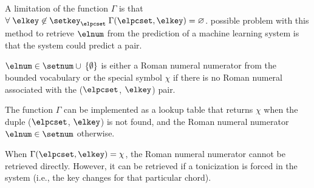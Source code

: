 A limitation of the function $\Gamma$ is that $\forall \;
\elkey \not\in \setkey_\elpcset \; \Gamma(\elpcset, \elkey)
= \varnothing$. possible problem with this method to
retrieve $\elnum$ from the prediction of a machine learning
system is that the system could predict a pair.

$\elnum \in \setnum \cup \: \{ \emptyset \}$ is either a
Roman numeral numerator from the bounded vocabulary or the
special symbol $\chi$ if there is no Roman numeral
associated with the ($\elpcset$, $\elkey$) pair.

The function $\Gamma$ can be implemented as a lookup table
that returns $\chi$ when the duple ($\elpcset$, $\elkey$) is
not found, and the Roman numeral numerator $\elnum \in
\setnum$ otherwise.

When $\Gamma(\elpcset, \elkey) = \chi$, the Roman numeral
numerator cannot be retrieved directly. However, it can be
retrieved if a tonicization is forced in the system (i.e.,
the key changes for that particular chord).

